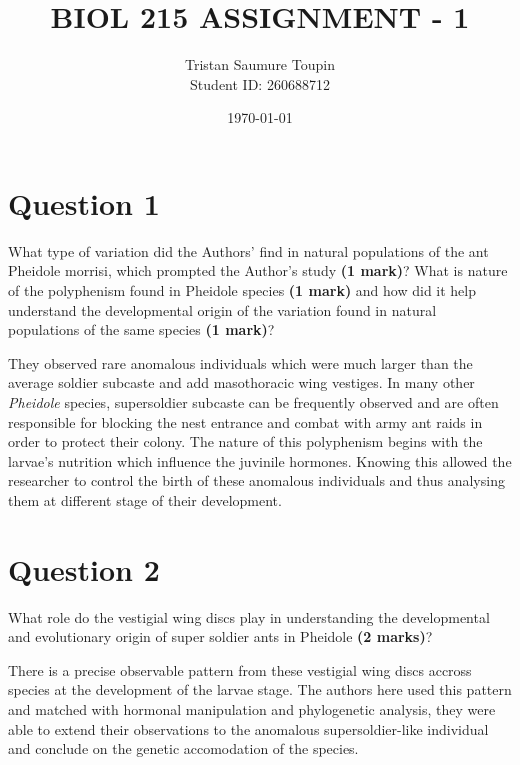 \documentclass[letterpaper,12pt]{article}
\newenvironment{myindentpar}[1]%
{\begin{list}{}%
          {\setlength{\leftmargin}{#1}}%
          \item[]%
}
{\end{list}}
\begin{document}
\title{BIOL 215 ASSIGNMENT - 1}
\author{Tristan Saumure Toupin \\ Student ID: 260688712}
\date{\today}
\maketitle


\section{Question 1}

What type of variation did the Authors’ find in natural populations of the ant Pheidole morrisi, which prompted the Author’s study \textbf{(1 mark)}? What is nature of the polyphenism found in Pheidole species \textbf{(1 mark)} and how did it help understand the developmental origin of the variation found in natural populations of the same species \textbf{(1 mark)}?
\vspace*{20px}

\begin{myindentpar}{0.5cm}
They observed rare anomalous individuals which were much larger than the average soldier subcaste and add masothoracic wing vestiges. In many other \textit{Pheidole} species, supersoldier subcaste can be frequently observed and are often responsible for blocking the nest entrance and combat with army ant raids in order to protect their colony. The nature of this polyphenism begins with the larvae's nutrition which influence the juvinile hormones. Knowing this allowed the researcher to control the birth of these anomalous individuals and thus analysing them at different stage of their development.
\end{myindentpar}



\section{Question 2}

What role do the vestigial wing discs play in understanding the developmental and evolutionary origin of super soldier ants in Pheidole \textbf{(2 marks)}?
\vspace*{20px}

\begin{myindentpar}{0.5cm}
There is a precise observable pattern from these vestigial wing discs accross species at the development of the larvae stage. The authors here used this pattern and matched with hormonal manipulation and phylogenetic analysis, they were able to extend their observations to the anomalous supersoldier-like individual and conclude on the genetic accomodation of the species.
\end{myindentpar}
\end{document}
